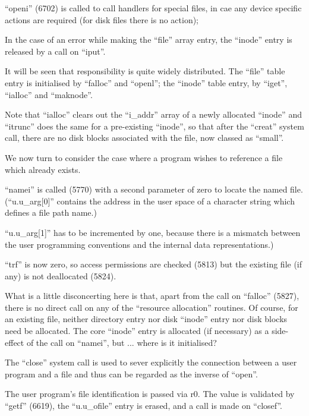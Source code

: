 \item[5832:] ``openi'' (6702) is called to call
 handlers for special files, in
 cae any device specific actions
 are required (for disk files
 there is no action);

\item[5839:] In the case of an error while
 making the ``file'' array entry,
 the ``inode'' entry is released by
 a call on ``iput''.
\ed

It will be seen that responsibility is
quite widely distributed. The ``file''
table entry is initialised by ``falloc''
and ``openl''; the ``inode'' table entry,
by ``iget'', ``ialloc'' and ``maknode''.

Note that ``ialloc'' clears out the
``i\_addr'' array of a newly allocated
``inode'' and ``itrunc'' does the same for
a pre-existing ``inode'', so that after
the ``creat'' system call, there are no
disk blocks associated with the file,
now classed as ``small''.



We now turn to consider the case where
a program wishes to reference a file
which already exists.

``namei'' is called (5770) with a second
parameter of zero to locate the named
file. (``u.u\_arg[0]'' contains the
address in the user space of a character string which defines a file path
name.)

``u.u\_arg[1]'' has to be incremented by
one, because there is a mismatch
between the user programming conventions and the internal data representations.)



``trf'' is now zero, so access permissions are checked (5813) but the existing file (if any) is not deallocated
(5824).

What is a little disconcerting here is
that, apart from the call on ``falloc''
(5827), there is no direct call on any
of the ``resource allocation'' routines.
Of course, for an existing file, neither directory entry nor disk ``inode''
entry nor disk blocks need be allocated. The core ``inode'' entry is allocated (if necessary) as a side-effect
of the call on ``namei'', but ... where
is it initialised?



The ``close'' system call is used to
sever explicitly the connection between
a user program and a file and thus can
be regarded as the inverse of ``open''.


The user program's file identification
is passed via r0. The value is validated by
``getf'' (6619), the ``u.u\_ofile''
entry is erased, and a call is made on ``closef''.


